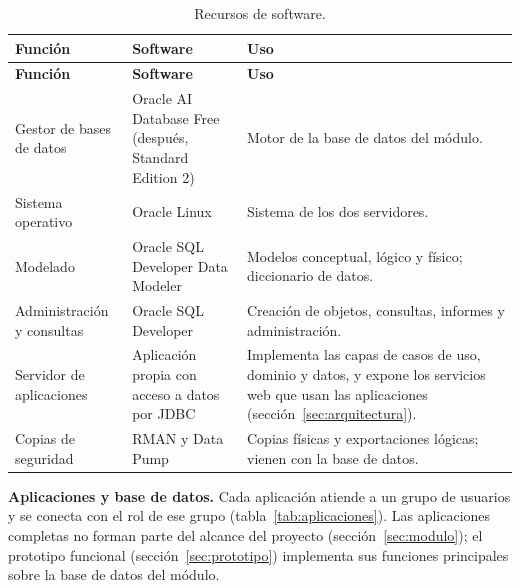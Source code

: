 {\singlespacing\small
\begin{longtable}{L{3.6cm} L{4.6cm} L{6.2cm}}
\caption{Recursos de software.}
\label{tab:software}\\
\toprule
\textbf{Función} & \textbf{Software} & \textbf{Uso} \\
\midrule
\endfirsthead
\toprule
\textbf{Función} & \textbf{Software} & \textbf{Uso} \\
\midrule
\endhead
\bottomrule
\endfoot
Gestor de bases de datos & Oracle AI Database Free (después, Standard Edition 2) & Motor de la base de datos del módulo. \\
Sistema operativo & Oracle Linux & Sistema de los dos servidores. \\
Modelado & Oracle SQL Developer Data Modeler & Modelos conceptual, lógico y físico; diccionario de datos. \\
Administración y consultas & Oracle SQL Developer & Creación de objetos, consultas, informes y administración. \\
Servidor de aplicaciones & Aplicación propia con acceso a datos por JDBC & Implementa las capas de casos de uso, dominio y datos, y expone los servicios web que usan las aplicaciones (sección~\ref{sec:arquitectura}). \\
Copias de seguridad & RMAN y Data Pump & Copias físicas y exportaciones lógicas; vienen con la base de datos. \\
\end{longtable}
\par}

\textbf{Aplicaciones y base de datos.} Cada aplicación atiende a un grupo
de usuarios y se conecta con el rol de ese grupo
(tabla~\ref{tab:aplicaciones}). Las aplicaciones completas no forman
parte del alcance del proyecto (sección~\ref{sec:modulo}); el prototipo
funcional (sección~\ref{sec:prototipo}) implementa sus funciones
principales sobre la base de datos del módulo.

